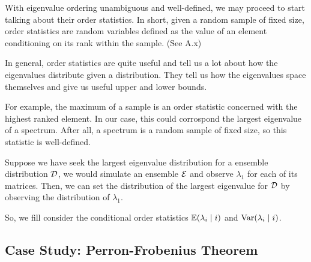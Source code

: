 \spectrumschemetable



With eigenvalue ordering unambiguous and well-defined, we may proceed to start talking about their order statistics. In short, given a random sample of fixed size, order statistics are random variables defined as the value of an element conditioning on its rank within the sample. (See A.x)

In general, order statistics are quite useful and tell us a lot about how the eigenvalues distribute given a distribution. They tell us how the eigenvalues space themselves and give us useful upper and lower bounds.

For example, the maximum of a sample is an order statistic concerned with the highest ranked element. In our case, this could corrospond the largest eigenvalue of a spectrum. After all, a spectrum is a random sample of fixed size, so this statistic is well-defined.

\begin{example}
Suppose we have seek the largest eigenvalue distribution for a ensemble distribution $\mathcal{D}$, we would simulate an ensemble $\mathcal{E}$ and observe $\lambda_1$ for each of its matrices. Then, we can set the distribution of the largest eigenvalue for $\mathcal{D}$ by observing the distribution of $\lambda_1$.
\end{example}

So, we fill consider the conditional order statistics $\mathbb{E}(\lambda_{i} \mid i)$ and $\text{Var}(\lambda_{i} \mid i)$.

\newpage
\subsection{Case Study: Perron-Frobenius Theorem}

